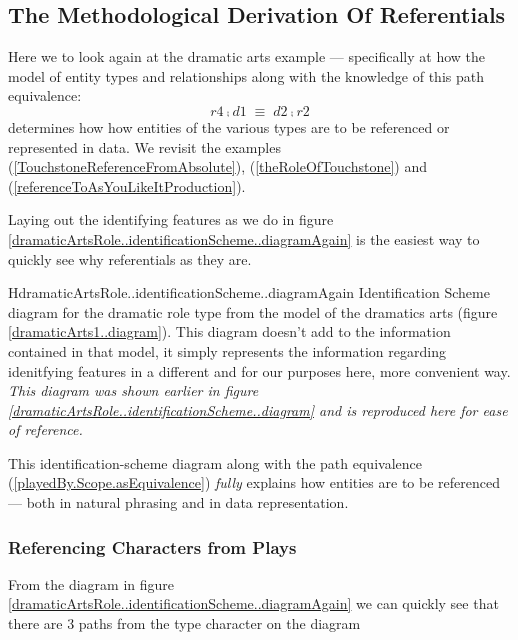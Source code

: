 \subsection{The Methodological Derivation Of Referentials}

Here we to look again at the dramatic arts example --- specifically at how the model of entity types and relationships
along with the knowledge of this path equivalence:
\begin{equation}
\label{playedBy.Scope.asEquivalence}
r4 \comp d1 \;\equiv\; d2 \comp r2
\end{equation}
determines how how entities
of the various types are to be referenced or represented in data. We revisit the examples (\ref{TouchstoneReferenceFromAbsolute}), (\ref{theRoleOfTouchstone}) and (\ref{referenceToAsYouLikeItProduction}).

Laying out the identifying features as we do in figure \ref{dramaticArtsRole..identificationScheme..diagramAgain} is the easiest way to quickly see why referentials as they are.

\begin{erboxedFigure}{H}{dramaticArtsRole..identificationScheme..diagramAgain}
{Identification Scheme diagram for the dramatic role type
from the model of the dramatics arts (figure \ref{dramaticArts1..diagram}). This diagram doesn't add to the information
contained in that model, it simply represents the information regarding idenitfying features in a  different
 and for our purposes here, more convenient way. \textit{This diagram was shown earlier
in figure \ref{dramaticArtsRole..identificationScheme..diagram} and is reproduced here for ease of reference.}
} %
\begin{equation*}

\end{equation*}
\end{erboxedFigure}

This identification-scheme diagram along with the path equivalence (\ref{playedBy.Scope.asEquivalence})
 \textit{fully} explains how entities are to be referenced — both in natural phrasing and in data representation.

\subsubsection{Referencing Characters from Plays}

From the diagram in figure \ref{dramaticArtsRole..identificationScheme..diagramAgain} 
we can quickly see that there are 3 paths from the type character on the diagram
 
